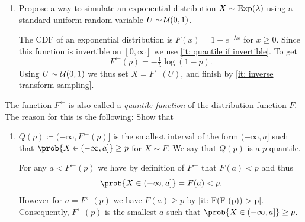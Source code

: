 \begin{exercise}
\begin{enumerate}[label=(\alph*), noitemsep]
        \item Propose a way to simulate an exponential distribution \(X \sim
        \mathrm{Exp}(\lambda)\) using a standard uniform random variable \(U\sim
        \mathcal{U}(0,1)\).
        \begin{solution}
            The CDF of an exponential distribution is \(F(x) = 1 - e^{-\lambda x}\) for \(x \ge 0\).
            Since this function is invertible on \([0, \infty]\) we use
            \ref{it: quantile if invertible}. To get
            \[
                F^{\leftarrow}(p) = -\tfrac{1}{\lambda} \log(1-p).
            \]
            Using \(U \sim \mathcal{U}(0,1)\) we thus set \(X = F^{\leftarrow}(U)\),
            and finish by \ref{it: inverse transform sampling}.
        \end{solution}

    \end{enumerate}
    The function \(F^{\leftarrow}\) is also called a \emph{quantile function} of
    the distribution function \(F\). The reason for this is
    the following: Show that
    \begin{enumerate}[resume, label=(\alph*), noitemsep]
        \item \(Q(p) \coloneq (-\infty, F^{\leftarrow}(p)]\) is the smallest
        interval of the form \((-\infty, a]\) such that \(\prob{X \in (-\infty,
        a]} \ge p\) for \(X\sim F\). We say that \(Q(p)\) is a \(p\)-quantile.
        \begin{solution}
            For any \(a < F^{\leftarrow}(p)\) we have by definition of \(F^{\leftarrow}\) that
            \(F(a) < p\) and thus
            \[
                \prob{X \in (-\infty, a]} = F(a) < p.
            \]
            However for \(a=F^{\leftarrow}(p)\) we have \(F(a)\ge p\) by
            \ref{it: F(F-(p)) > p}.  Consequently, \(F^{\leftarrow}(p)\) is the
            smallest \(a\) such that \(\prob{X \in (-\infty, a]} \ge p\).
        \end{solution}

    \end{enumerate}
\end{exercise}

